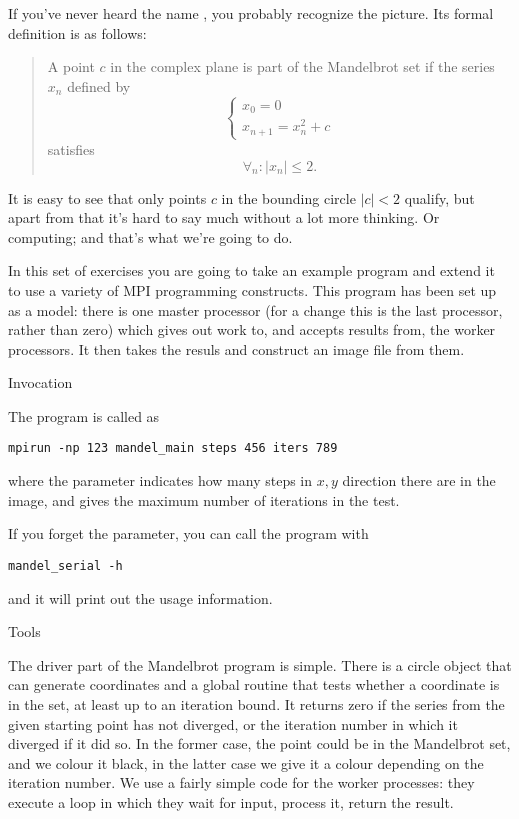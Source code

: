 If you've never heard the name , you
probably recognize the picture. Its formal definition is as follows:
\begin{quotation}\noindent
  A point $c$ in the complex plane is part of the Mandelbrot set if 
  the series $x_n$ defined by 
  \[ 
  \begin{cases}
    x_0=0\\ x_{n+1}=x_n^2+c
  \end{cases}
  \] satisfies \[ \forall_n\colon |x_n|\leq 2. \]  
\end{quotation}
It is easy to see that only points $c$ in the bounding circle
$|c|< 2$ qualify, but
apart from that it's hard to say much without a lot more thinking.
Or computing; and that's what we're going to do.

In this set of exercises you are going to take an example program
 and extend it to use a variety of MPI programming
constructs.  This program has been set up as a
 model: there is one master processor (for a
change this is the last processor, rather than zero) which gives out
work to, and accepts results from, the worker processors. It then
takes the resuls and construct an image file from them.

 {Invocation}

The  program is called as
\begin{verbatim}
mpirun -np 123 mandel_main steps 456 iters 789
\end{verbatim}
where the  parameter indicates how many steps in $x,y$
direction there are in the image, and  gives the maximum
number of iterations in the  test.

If you forget the parameter, you can call the program with
\begin{verbatim}
mandel_serial -h
\end{verbatim}
and it will print out the usage information.

 {Tools}

The driver part of the Mandelbrot program is simple. There is a 
circle object that can generate coordinates
and a global routine that tests whether a coordinate is in the set,
at least up to an iteration bound. It returns zero if the 
series from the given starting point has not diverged,
or the iteration number in which it diverged if it did so.
In the former case,  the point could be in the Mandelbrot set, 
and we colour it black, in the latter case we give it a colour
depending on the iteration number.
We use a fairly simple code for the worker processes: they 
execute a loop in which they wait 
for input, process it, return the result.

